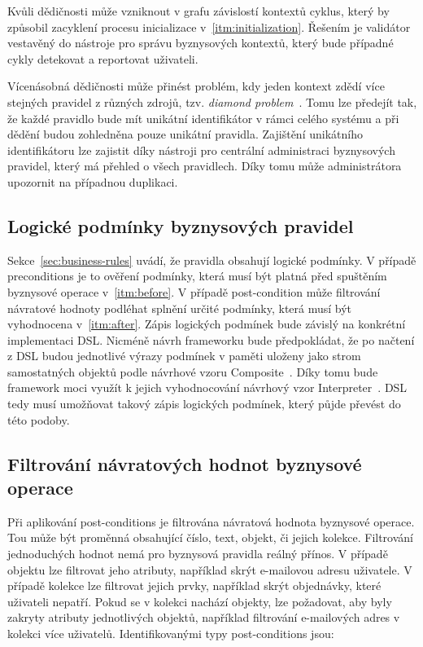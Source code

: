 Kvůli dědičnosti může vzniknout v grafu závislostí kontextů cyklus, který by způsobil zacyklení
procesu inicializace v~\ref{itm:initialization}. Řešením je validátor vestavěný do nástroje pro
správu byznysových kontextů, který bude případné cykly detekovat a reportovat uživateli.

Vícenásobná dědičnosti může přinést problém, kdy jeden kontext zdědí více stejných pravidel z
různých zdrojů, tzv. \textit{diamond problem}~\cite{boyen1994generalized}. Tomu lze předejít tak, že
každé pravidlo bude mít unikátní identifikátor v rámci celého systému a při dědění budou zohledněna
pouze unikátní pravidla. Zajištění unikátního identifikátoru lze zajistit díky nástroji pro centrální
administraci byznysových pravidel, který má přehled o všech pravidlech. Díky tomu může administrátora
upozornit na případnou duplikaci.

\subsection{Logické podmínky byznysových pravidel}\label{sec:expressions-design}

Sekce~\ref{sec:business-rules} uvádí, že pravidla obsahují logické podmínky. V případě preconditions je to
ověření podmínky, která musí být platná před spuštěním byznysové operace v~\ref{itm:before}. V případě
post-condition může filtrování návratové hodnoty podléhat splnění určité podmínky, která musí být
vyhodnocena v~\ref{itm:after}. Zápis logických podmínek bude závislý na konkrétní implementaci \gls{DSL}.
Nicméně návrh frameworku bude předpokládat, že po načtení z \gls{DSL} budou jednotlivé výrazy podmínek v paměti
uloženy jako strom samostatných objektů podle návrhové vzoru Composite~\cite{fowler2002patterns}. Díky tomu
bude framework moci využít k jejich vyhodnocování návrhový vzor Interpreter~\cite{fowler2002patterns}.
\gls{DSL} tedy musí umožňovat takový zápis logických podmínek, který půjde převést do této podoby.

\subsection{Filtrování návratových hodnot byznysové operace}

Při aplikování post-conditions je filtrována návratová hodnota byznysové operace. Tou může být proměnná
obsahující číslo, text, objekt, či jejich kolekce. Filtrování jednoduchých hodnot nemá pro byznysová pravidla reálný přínos.
V případě objektu lze filtrovat jeho atributy, například skrýt e-mailovou adresu uživatele.
V případě kolekce lze filtrovat jejich prvky, například skrýt objednávky, které uživateli nepatří.
Pokud se v kolekci nachází objekty, lze požadovat, aby byly zakryty atributy jednotlivých objektů,
například filtrování e-mailových adres v kolekci více uživatelů. Identifikovanými typy post-conditions jsou:

